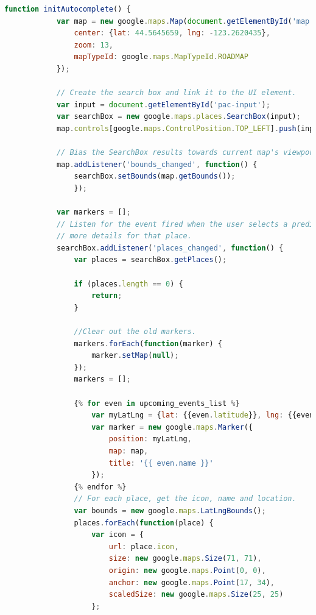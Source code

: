 \documentclass[draftclsnofoot,10pt,onecolumn]{IEEEtran} %
\begin{document}
\begin{center}
\captionsetup{width=.5\linewidth}
	\begin{lstlisting}[caption=The eventSearch.html has a mixture of JavaScript and HTML that create the Google Map and search bar along with creating markers for events., language=JavaScript]
        function initAutocomplete() {
            var map = new google.maps.Map(document.getElementById('map'), {
                center: {lat: 44.5645659, lng: -123.2620435},
                zoom: 13,
                mapTypeId: google.maps.MapTypeId.ROADMAP
            });

            // Create the search box and link it to the UI element.
            var input = document.getElementById('pac-input');
            var searchBox = new google.maps.places.SearchBox(input);
            map.controls[google.maps.ControlPosition.TOP_LEFT].push(input);

            // Bias the SearchBox results towards current map's viewport.
            map.addListener('bounds_changed', function() {
                searchBox.setBounds(map.getBounds());
                });

            var markers = [];
            // Listen for the event fired when the user selects a prediction and retrieve
            // more details for that place.
            searchBox.addListener('places_changed', function() {
                var places = searchBox.getPlaces();

                if (places.length == 0) {
                    return;
                }
                
                //Clear out the old markers.
                markers.forEach(function(marker) {
                    marker.setMap(null);
                });
                markers = [];

                {% for even in upcoming_events_list %}
                    var myLatLng = {lat: {{even.latitude}}, lng: {{even.longitude}}};
                    var marker = new google.maps.Marker({
                        position: myLatLng,
                        map: map,
                        title: '{{ even.name }}'
                    });
                {% endfor %}
                // For each place, get the icon, name and location.
                var bounds = new google.maps.LatLngBounds();
                places.forEach(function(place) {
                    var icon = {
                        url: place.icon,
                        size: new google.maps.Size(71, 71),
                        origin: new google.maps.Point(0, 0),
                        anchor: new google.maps.Point(17, 34),
                        scaledSize: new google.maps.Size(25, 25)
                    };


\end{lstlisting}
\end{center}
\end{document}
